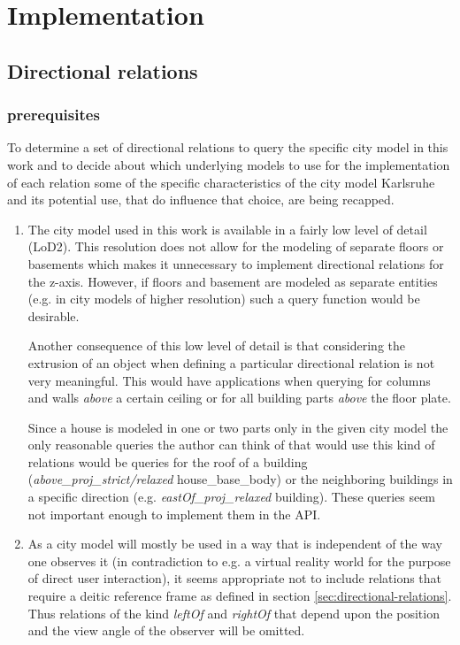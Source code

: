 \documentclass[paper=a4, fontsize=11pt]{scrartcl} %
\numberwithin{equation}{section} %
\numberwithin{figure}{section} %
\numberwithin{table}{section} %
\begin{document}
\section{Implementation}
\subsection{Directional relations}
\subsubsection{prerequisites}

To determine a set of directional relations to query the specific city model in this work and to decide about which underlying models to use for the implementation of each relation some of the specific characteristics of the city model Karlsruhe and its potential use, that do influence that choice, are being recapped.  

\begin{enumerate}
\item The city model used in this work is available in a fairly low level of detail (LoD2). This resolution does not allow for the modeling of separate floors or basements which makes it unnecessary to implement directional relations for the z-axis. However, if floors and basement are modeled as separate entities (e.g. in city models of higher resolution) such a query function would be desirable.

Another consequence of this low level of detail is that considering the extrusion of an object when defining a particular directional relation is not very meaningful. This would have applications when querying for columns and walls \emph{above} a certain ceiling or for all building parts \emph{above} the floor plate. 

Since a house is modeled in one or two parts only in the given city model the only reasonable queries the author can think of that would use this kind of relations would be queries for the roof of a building (\textit{above\_proj\_strict/relaxed} house\_base\_body) or the neighboring buildings in a specific direction (e.g. \textit{eastOf\_proj\_relaxed} building). These queries seem not important enough to implement them in the API.

\item  As a city model will mostly be used in a way that is independent of the way one observes it (in contradiction to e.g. a virtual reality world for the purpose  of direct user interaction), it seems appropriate not to include relations that require a deitic reference frame as defined in section \ref{sec:directional-relations}. Thus relations of the kind \emph{leftOf} and \emph{rightOf} that depend upon the position and the view angle of the observer will be omitted.
\end{enumerate}
\end{document}
